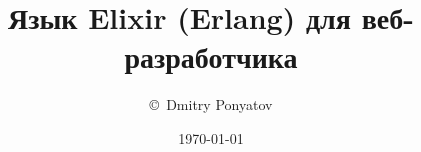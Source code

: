 
\title{Язык Elixir (Erlang) для веб-разработчика}
\author{\copyright\ Dmitry Ponyatov }
\date{\today}

    
        \ \\
        
        {\LARGE \thetitle}

        \ \\

        \theauthor
        
        \ \\
        
        \thedate

        \begin{flushright}
        \end{flushright}

    \tableofcontents
    
    

